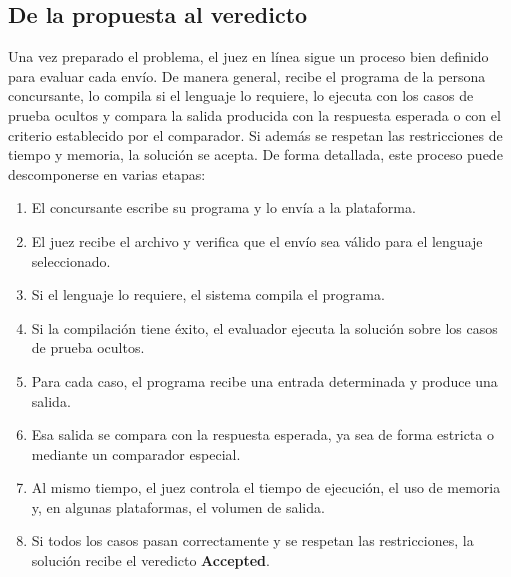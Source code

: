 \subsection{De la propuesta al veredicto}

Una vez preparado el problema, el juez en línea sigue un proceso bien definido para evaluar cada envío. De manera general, recibe el programa de la persona concursante, lo compila si el lenguaje lo requiere, lo ejecuta con los casos de prueba ocultos y compara la salida producida con la respuesta esperada o con el criterio establecido por el comparador. Si además se respetan las restricciones de tiempo y memoria, la solución se acepta. De forma detallada, este proceso puede descomponerse en varias etapas:
\begin{enumerate}
    \item El concursante escribe su programa y lo envía a la plataforma.
    \item El juez recibe el archivo y verifica que el envío sea válido para el lenguaje seleccionado.
    \item Si el lenguaje lo requiere, el sistema compila el programa.
    \item Si la compilación tiene éxito, el evaluador ejecuta la solución sobre los casos de prueba ocultos.
    \item Para cada caso, el programa recibe una entrada determinada y produce una salida.
    \item Esa salida se compara con la respuesta esperada, ya sea de forma estricta o mediante un comparador especial.
    \item Al mismo tiempo, el juez controla el tiempo de ejecución, el uso de memoria y, en algunas plataformas, el volumen de salida.
    \item Si todos los casos pasan correctamente y se respetan las restricciones, la solución recibe el veredicto \textbf{Accepted}.
\end{enumerate}

